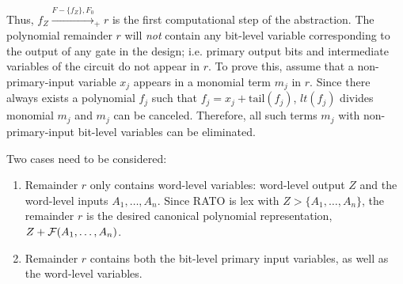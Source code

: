 Thus, $f_Z\xrightarrow{F-\{f_Z\},F_0}_+ r$ is the first computational step 
of the abstraction.
The polynomial remainder $r$
will {\it not} contain any bit-level variable corresponding to the
output of any gate in the design;  i.e. primary output bits and
intermediate variables of the circuit do not appear in $r$. To prove
this, assume that a non-primary-input variable $x_j$ appears in a
monomial term $m_j$ in $r$. Since there always exists a polynomial
$f_j$ such that $f_j = x_j + \text{tail}(f_j)$, $lt(f_j)$
divides monomial $m_j$ and $m_j$ can be canceled. Therefore, all
such terms $m_j$ with non-primary-input bit-level variables can be
eliminated.  

Two cases need to be considered: 
\begin{enumerate}
\item Remainder $r$ only contains word-level variables:
  word-level output $Z$ and the word-level 
  inputs $A_1,\dots,A_n$. 
  Since RATO is lex with $Z > \{A_1,\dots,A_n\}$, the remainder $r$
  is the desired canonical polynomial representation,
  $Z + {\mathcal{F}}(A_1,\dots,A_n)$.
\item Remainder $r$ contains both the bit-level primary
  input variables, as well as the word-level
  variables.  
\end{enumerate}


